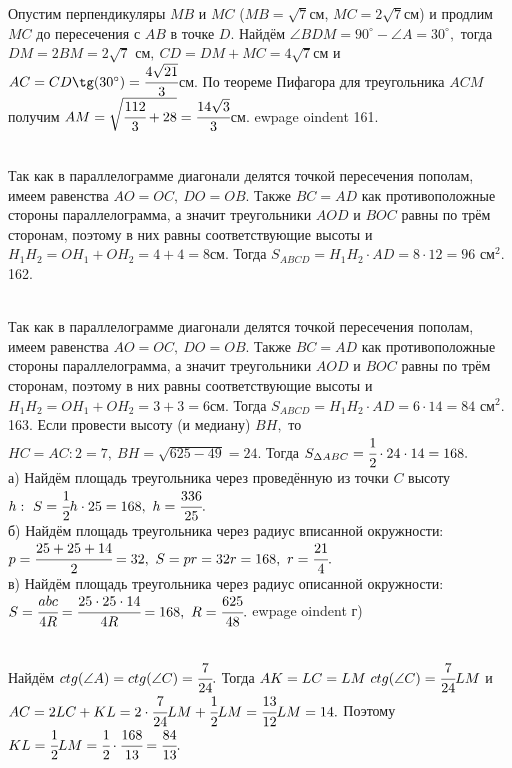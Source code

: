 Опустим перпендикуляры $MB$ и $MC$ ($MB=\sqrt{7}$см, $MC=2\sqrt{7}$см) и продлим $MC$ до пересечения с $AB$ в точке $D.$ Найдём $\angle BDM=90^\circ-\angle A=30^\circ,$ тогда $DM=2BM=2\sqrt{7}\text{ см},\ CD=DM+MC=4\sqrt{7}$см и $AC=CD\tg(30^\circ)=\cfrac{4\sqrt{21}}{3}$см. По теореме Пифагора для треугольника $ACM$ получим $AM=\sqrt{\cfrac{112}{3}+28}=\cfrac{14\sqrt{3}}{3}$см.
ewpage
oindent
161. \begin{figure}[ht!]
\end{figure}\\
Так как в параллелограмме диагонали делятся точкой пересечения пополам, имеем равенства $AO=OC,\ DO=OB.$ Также $BC=AD$ как противоположные стороны параллелограмма, а значит треугольники $AOD$ и $BOC$ равны по трём сторонам, поэтому в них равны соответствующие высоты и $H_1H_2=OH_1+OH_2=4+4=8$см. Тогда $S_{ABCD}=H_1H_2\cdot AD=8\cdot12=96\text{ см}^2.$\\
162. \begin{figure}[ht!]
\end{figure}\\
Так как в параллелограмме диагонали делятся точкой пересечения пополам, имеем равенства $AO=OC,\ DO=OB.$ Также $BC=AD$ как противоположные стороны параллелограмма, а значит треугольники $AOD$ и $BOC$ равны по трём сторонам, поэтому в них равны соответствующие высоты и $H_1H_2=OH_1+OH_2=3+3=6$см. Тогда $S_{ABCD}=H_1H_2\cdot AD=6\cdot14=84\text{ см}^2.$
163. Если провести высоту (и медиану) $BH,$ то $HC=AC:2=7,\ BH=\sqrt{625-49}=24.$ Тогда $S_{\Delta ABC}=\cfrac{1}{2}\cdot24\cdot14=168.$\\
а) Найдём площадь треугольника через проведённую из точки $C$ высоту $h:\ S=\cfrac{1}{2}h\cdot25=168,\ h=\cfrac{336}{25}.$\\
б) Найдём площадь треугольника через радиус вписанной окружности: $p=\cfrac{25+25+14}{2}=32,\ S=pr=32r=168,\ r=\cfrac{21}{4}.$\\
в) Найдём площадь треугольника через радиус описанной окружности: $S=\cfrac{abc}{4R}=\cfrac{25\cdot25\cdot14}{4R}=168,\ R=\cfrac{625}{48}.$
ewpage
oindent
г) \begin{figure}[ht!]
\end{figure}\\
Найдём $ctg(\angle A)=ctg(\angle C)=\cfrac{7}{24}.$ Тогда $AK=LC=LM\ ctg(\angle C)=\cfrac{7}{24}LM$ и $AC=2LC+KL=2\cdot\cfrac{7}{24}LM+\cfrac{1}{2}LM=\cfrac{13}{12}LM=14.$ Поэтому $KL=\cfrac{1}{2}LM=\cfrac{1}{2}\cdot\cfrac{168}{13}=\cfrac{84}{13}.$\\
